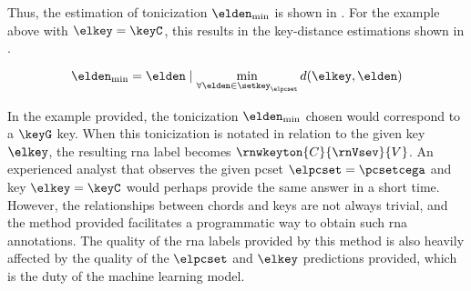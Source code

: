
Thus, the estimation of tonicization $\elden_{\min}$ is
shown in . For the example
above with $\elkey = \keyC$, this results in the
key-distance estimations shown in
.

\begin{equation}
    \label{eq:tonicization_estimation}
    \elden_{\min} = \elden \mid \min_{\forall \elden \in \setkey_\elpcset} d(\elkey, \elden)
\end{equation}


In the example provided, the tonicization $\elden_{\min}$
chosen would correspond to a $\keyG$ key. When this
tonicization is notated in relation to the given key
$\elkey$, the resulting \gls{rna} label becomes
$\rnwkeyton{C}{\rnVsev}{V}$. An experienced analyst that
observes the given \gls{pcset} $\elpcset = \pcsetcega$ and
key $\elkey = \keyC$ would perhaps provide the same answer
in a short time. 
However, the relationships between chords and keys are not
always trivial, and the method provided facilitates a
programmatic way to obtain such \gls{rna} annotations. The
quality of the \gls{rna} labels provided by this method is
also heavily affected by the quality of the $\elpcset$ and
$\elkey$ predictions provided, which is the duty of the
machine learning model.
